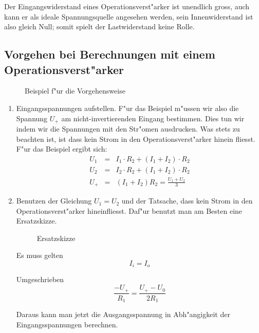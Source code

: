 \documentclass[german, 10pt, a4paper, headsepline]{scrreprt}
\theoremstyle{remark}
\begin{document}
Der Eingangswiderstand eines Operationsverst"arker ist unendlich gross, auch kann er als ideale Spannungsquelle angesehen werden, sein Innenwiderstand ist also gleich Null; somit spielt der Lastwiderstand keine Rolle.

\subsection{Vorgehen bei Berechnungen mit einem Operationsverst"arker}

\begin{figure}[htb]
 
 \centerline{\box\graph}
 \caption{Beispiel f"ur die Vorgehensweise}
\end{figure}

\begin{enumerate}
	\item Eingangsspannungen aufstellen. F"ur das Beispiel m"ussen wir also die Spannung $U_+$ am nicht-invertierenden Eingang bestimmen. Dies tun wir indem wir die Spannungen mit den Str"omen ausdrucken. Was stets zu beachten ist, ist dass kein Strom in den Operationsverst"arker hinein fliesst. F"ur das Beispiel ergibt sich:
	\begin{eqnarray*}
		U_1 &	= &	I_1 \cdotp R_2 + (I_1 + I_2) \cdotp R_2\\
		U_2 &	= &	I_2 \cdotp R_2 + (I_1 + I_2) \cdotp R_2\\
		U_+ &	= &	(I_1 + I_2) R_2 = \frac{U_1 + U_2}{3}
	\end{eqnarray*}
	\item Benutzen der Gleichung $U_1 = U_2$ und der Tatsache, dass kein Strom in den Operationsverst"arker hineinfliesst. Daf"ur benutzt man am Besten eine Ersatzskizze. 
	\begin{figure}[htb]
	 
	 \centerline{\box\graph}
	 \caption{Ersatzskizze}
	\end{figure}

	Es muss gelten 
	\begin{displaymath}
		I_{i} = I_{o}
	\end{displaymath}
	
	Umgeschrieben
	\begin{displaymath}
		\frac{-U_{+}}{R_1} = \frac{U_+ - U_0}{2 R_1}
	\end{displaymath}

	Daraus kann man jetzt die Ausgangsspannung in Abh"angigkeit der Eingangsspannungen berechnen.
\end{enumerate}
\end{document}
